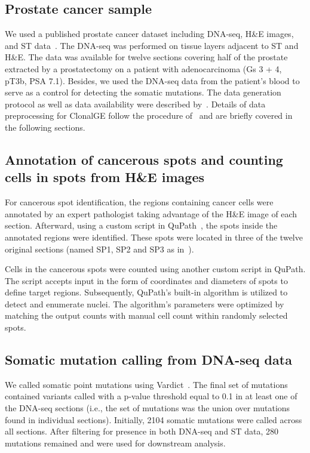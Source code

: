 \documentclass[unnumsec,webpdf,contemporary,large]{oup-authoring-template}%
\theoremstyle{thmstyleone}%
\theoremstyle{thmstyletwo}%
\theoremstyle{thmstylethree}%
\newcommand{\rev}[1]{{\color{revisionblue}#1}}
\begin{document}
\begin{methods}
\subsection*{Prostate cancer sample}
We used a published prostate cancer dataset including DNA-seq, H\&E images, and ST data~\citep{berglund2018spatial}. The DNA-seq was performed on tissue layers adjacent to ST and H\&E. The data was available for twelve sections covering half of the prostate extracted by a prostatectomy on a patient with adenocarcinoma (Gs 3 + 4, pT3b, PSA 7.1). Besides, we used the DNA-seq data from the patient's blood to serve as a control for detecting the somatic mutations. 
The data generation protocol  as well as data availability were described by~\cite{berglund2018spatial}. Details of data preprocessing for ClonalGE follow the procedure of~\cite{shafighi2024integrative} and are briefly covered in the following sections.

\subsection*{Annotation of cancerous spots and counting cells in spots from H\&E images} 
For cancerous spot identification, the regions containing cancer cells were annotated by an expert pathologist taking advantage of the H\&E image of each section. Afterward, using a custom script in QuPath~\citep{bankhead2017qupath}, the spots inside the annotated regions were identified. These spots were located in three of the twelve original sections (named SP1, SP2 and SP3 as in~\cite{shafighi2024integrative}). 

Cells in the cancerous spots were counted using another custom script in QuPath. The script accepts input in the form of coordinates and diameters of spots to define target regions. Subsequently, QuPath's built-in algorithm is utilized to detect and enumerate nuclei. The algorithm's parameters were optimized by matching the output counts with manual cell count within randomly selected spots. 

\subsection*{Somatic mutation calling from DNA-seq data}
We called somatic point mutations  using Vardict~\citep{lai2016vardict}.  The final set of  mutations contained variants called with a p-value threshold equal to 0.1 in at least one of the DNA-seq sections (i.e., the set of mutations was the union over mutations found in individual sections). \rev{Initially, 2104 somatic mutations were called across all sections. After filtering for presence in both DNA-seq and ST data, 280 mutations remained and were used for downstream analysis.}


\end{methods}
\end{document}
